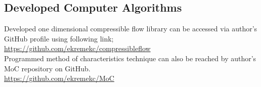 \begin{appendices}
\newpage
\section{Developed Computer Algorithms }
Developed one dimensional compressible flow library can be accessed via author's GitHub profile using following link;\\

\url{https://github.com/ekremekc/compressibleflow}\\

\noindent Programmed method of characteristics technique can also be reached by author's MoC repository on GitHub.\\

\url{https://github.com/ekremekc/MoC}

\end{appendices}
\afterpage{\blankpage}

